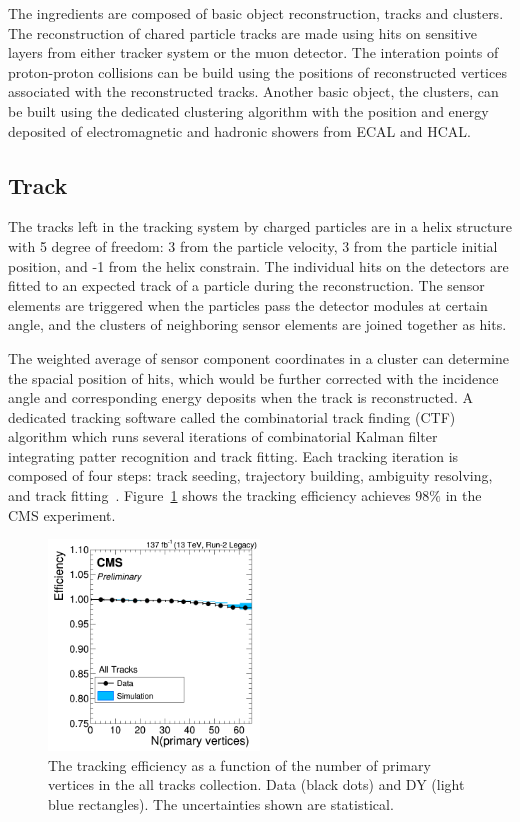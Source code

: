 The ingredients are composed of basic object reconstruction, tracks and clusters.
The reconstruction of chared particle tracks are made using hits on sensitive layers from either tracker system or the muon detector.
The interation points of proton-proton collisions can be build using the positions of reconstructed vertices associated with the reconstructed tracks.
Another basic object, the clusters, can be built using the dedicated clustering algorithm with the position and energy deposited of electromagnetic and hadronic showers from ECAL and HCAL.
\subsection{Track}
The tracks left in the tracking system by charged particles are in a helix structure with 5 degree of freedom: 3 from the particle velocity, 3 from the particle initial position, and -1 from the helix constrain.
The individual hits on the detectors are fitted to an expected track of a particle during the reconstruction.
The sensor elements are triggered when the particles pass the detector modules at certain angle, and the clusters of neighboring sensor elements are joined together as hits.

The weighted average of sensor component coordinates in a cluster can determine the spacial position of hits, which would be further corrected with the incidence angle and corresponding energy deposits when the track is reconstructed.
A dedicated tracking software called the combinatorial track finding (CTF) algorithm which runs several iterations of combinatorial Kalman filter~\cite{Fruhwirth:1987fm} integrating patter recognition and track fitting.
Each tracking iteration is composed of four steps: track seeding, trajectory building, ambiguity resolving, and track fitting~\cite{CMS:2014pgm}.
Figure~\ref{fig:reco_track} shows the tracking efficiency achieves $98\%$ in the CMS experiment.

\begin{figure}\centering
    \includegraphics[width=0.5\textwidth]{figure/reco_track.png}
    \caption[The tracking efficiency as a function of the number of primary vertices in the all tracks collection.]
    {
        The tracking efficiency as a function of the number of primary vertices in the all tracks collection. 
        Data (black dots) and \MADGRAPH DY (light blue rectangles). 
        The uncertainties shown are statistical.
    }
    \label{fig:reco_track}
\end{figure}


